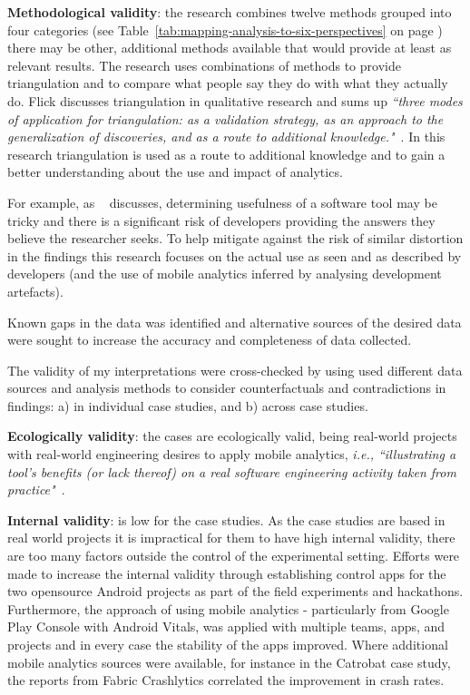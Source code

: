 \textbf{Methodological validity}: the research combines twelve methods grouped into four categories (see Table~\ref{tab:mapping-analysis-to-six-perspectives} on page \pageref{tab:mapping-analysis-to-six-perspectives}) there may be other, additional methods available that would provide at least as relevant results. The research uses combinations of methods to provide triangulation and to compare what people say they do with what they actually do. Flick discusses triangulation in qualitative research and sums up \emph{``three modes of application for triangulation: as a validation strategy, as an approach to the generalization of discoveries, and as a route to additional knowledge."}~\citep[p.183]{flick2004_triangulation_in_qualitative_research}. In this research triangulation is used as a route to additional knowledge and to gain a better understanding about the use and impact of analytics.

For example, as ~\citealt[pp.132-133]{Ko2015_a_practical_guide_to_controlled_experiments_of_sw_eng_tools_with_human_participants} discusses, determining usefulness of a software tool may be tricky and there is a significant risk of developers providing the answers they believe the researcher seeks. To help mitigate against the risk of similar distortion in the findings this research focuses on the actual use as seen and as described by developers (and the use of mobile analytics inferred by analysing development artefacts).

Known gaps in the data was identified and alternative sources of the desired data were sought to increase the accuracy and completeness of data collected.

The validity of my interpretations were cross-checked by using used different data sources and analysis methods to consider counterfactuals and contradictions in findings: a) in individual case studies, and b) across case studies.

\textbf{Ecologically validity}: the cases are ecologically valid, being real-world projects with real-world engineering desires to apply mobile analytics, \emph{i.e., ``illustrating a tool’s benefits (or lack thereof) on a real software engineering activity taken from practice"}~\citep[p.126]{Ko2015_a_practical_guide_to_controlled_experiments_of_sw_eng_tools_with_human_participants}.

\textbf{Internal validity}: is low for the case studies. As the case studies are based in real world projects it is impractical for them to have high internal validity, there are too many factors outside the control of the experimental setting. Efforts were made to increase the internal validity through establishing control apps for the two opensource Android projects as part of the field experiments and hackathons. Furthermore, the approach of using mobile analytics - particularly from Google Play Console with Android Vitals, was applied with multiple teams, apps, and projects and in every case the stability of the apps improved. Where additional mobile analytics sources were available, for instance in the Catrobat case study, the reports from Fabric Crashlytics correlated the improvement in crash rates.


